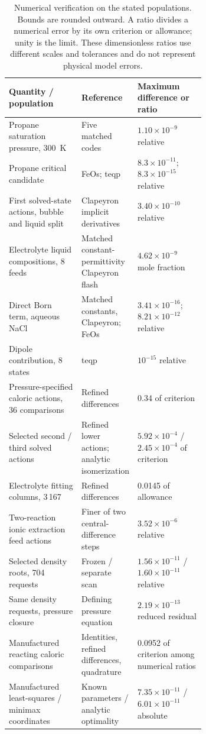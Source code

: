\begin{table}[pos=htbp]
\centering\small
\caption{Numerical verification on the stated populations. Bounds are rounded outward. A ratio divides a numerical error by its own criterion or allowance; unity is the limit. These dimensionless ratios use different scales and tolerances and do not represent physical model errors.}
\label{tab:verification}
\begin{tabularx}{\linewidth}{@{}p{0.37\linewidth}p{0.29\linewidth}X@{}}
\toprule
Quantity / population & Reference & Maximum difference or ratio \\
\midrule
Propane saturation pressure, 300~K & Five matched codes & $1.10\times10^{-9}$ relative \\
Propane critical candidate & FeOs; teqp & $8.3\times10^{-11}$; $8.3\times10^{-15}$ relative \\
First solved-state actions, bubble and liquid split & Clapeyron implicit derivatives & $3.40\times10^{-10}$ relative \\
Electrolyte liquid compositions, 8 feeds & Matched constant-permittivity Clapeyron flash & $4.62\times10^{-9}$ mole fraction \\
Direct Born term, aqueous NaCl & Matched constants, Clapeyron; FeOs & $3.41\times10^{-16}$; $8.21\times10^{-12}$ relative \\
Dipole contribution, 8 states & teqp & $10^{-15}$ relative \\
Pressure-specified caloric actions, 36 comparisons & Refined differences & 0.34 of criterion \\
Selected second / third solved actions & Refined lower actions; analytic isomerization & $5.92\times10^{-4}$ / $2.45\times10^{-4}$ of criterion \\
Electrolyte fitting columns, 3\,167 & Refined differences & 0.0145 of allowance \\
Two-reaction ionic extraction feed actions & Finer of two central-difference steps & $3.52\times10^{-6}$ relative \\
Selected density roots, 704 requests & Frozen / separate scan & $1.56\times10^{-11}$ / $1.60\times10^{-11}$ relative \\
Same density requests, pressure closure & Defining pressure equation & $2.19\times10^{-13}$ reduced residual \\
Manufactured reacting caloric comparisons & Identities, refined differences, quadrature & 0.0952 of criterion among numerical ratios \\
Manufactured least-squares / minimax coordinates & Known parameters / analytic optimality & $7.35\times10^{-11}$ / $6.01\times10^{-11}$ absolute \\
\bottomrule
\end{tabularx}
\end{table}

